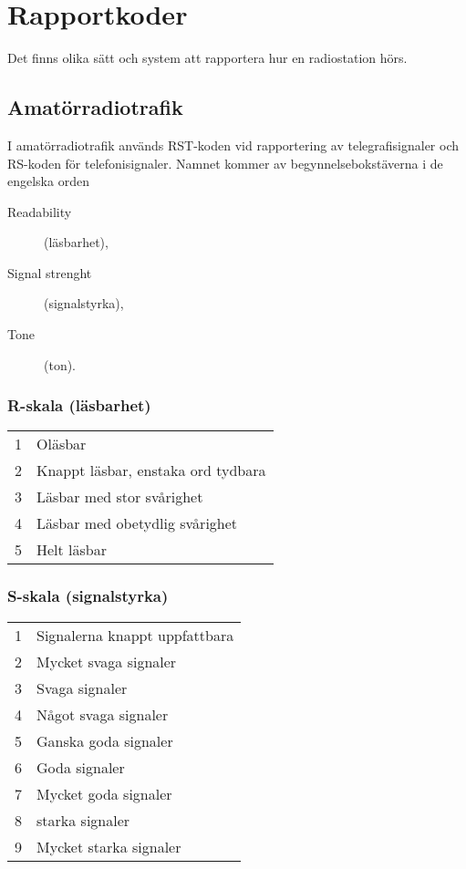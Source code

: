 \chapter{Rapportkoder}
\label{Rapportkoder}

Det finns olika sätt och system att rapportera hur en radiostation hörs.

\section{Amatörradiotrafik}

I amatörradiotrafik används RST-koden vid rapportering av
telegrafisignaler och RS-koden för telefonisignaler.
Namnet kommer av begynnelsebokstäverna i de engelska orden

\begin{description}
  \item[Readability] (läsbarhet),
  \item[Signal strenght] (signalstyrka),
  \item[Tone] (ton).
\end{description}

\subsection{R-skala (läsbarhet)}

\begin{tabular}{p{}p{}}
1 & Oläsbar \\
2 & Knappt läsbar, enstaka ord tydbara \\
3 & Läsbar med stor svårighet \\
4 & Läsbar med obetydlig svårighet \\
5 & Helt läsbar \\
\end{tabular}

\subsection{S-skala (signalstyrka)}

\begin{tabular}{p{}p{}}
1 & Signalerna knappt uppfattbara \\
2 & Mycket svaga signaler \\
3 & Svaga signaler \\
4 & Något svaga signaler \\
5 & Ganska goda signaler \\
6 & Goda signaler \\
7 & Mycket goda signaler \\
8 & starka signaler \\
9 & Mycket starka signaler \\
\end{tabular}

